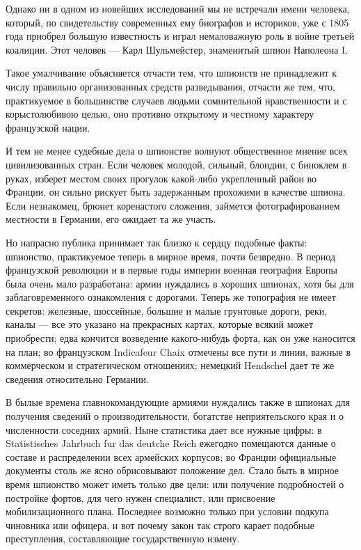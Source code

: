 \documentclass[
  oneside,
  12pt,
  titlepage]{book}
\begin{document}
Однако ни в одном из новейших исследований мы не встречали имени человека, который, по свидетельству современных ему биографов и историков, уже с 1805 года приобрел большую известность и играл немаловажную роль в войне третьей коалиции. Этот человек --- Карл Шульмейстер, знаменитый шпион Наполеона I.

Такое умалчивание объясняется отчасти тем, что шпионств не принадлежит к числу правильно организованных средств разведывания, отчасти же тем, что, практикуемое в большинстве случаев людьми сомнительной нравственности и с корыстолюбивою целью, оно противно открытому и честному характеру французской нации.

И тем не менее судебные дела о шпионстве волнуют общественное мнение всех цивилизованных стран. Если человек молодой, сильный, блондин, с биноклем в руках, изберет местом своих прогулок какой-либо укрепленный район во Франции, он сильно рискует быть задержанным прохожими в качестве шпиона. Если незнакомец, брюнет коренастого сложения, займется фотографированием местности в Германии, его ожидает та же участь.

Но напрасно публика принимает так близко к сердцу подобные факты: шпионство, практикуемое теперь в мирное время, почти безвредно. В период французской революции и в первые годы империи военная география Европы была очень мало разработана: армии нуждались в хороших шпионах, хотя бы для заблаговременного ознакомления с дорогами. Теперь же топография не имеет секретов: железные, шоссейные, большие и малые грунтовые дороги, реки, каналы --- все это указано на прекрасных картах, которые всякий может приобрести; едва кончится возведение какого-нибудь форта, как он уже наносится на план; во французском Indicafeur Chaix отмечены все пути и линии, важные в коммерческом и стратегическом отношениях; немецкий Hendschel дает те же сведения относительно Германии.

В былые времена главнокомандующие армиями нуждались также в шпионах для получения сведений о производительности, богатстве неприятельского края и о численности соседних армий. Ныне статистика дает все нужные цифры: в Statistisches Jahrbuch fur das deutche Reich ежегодно помещаются данные о составе и распределении всех армейских корпусов; во Франции официальные документы столь же ясно обрисовывают положение дел. Стало быть в мирное время шпионство может иметь только две цели: или получение подробностей о постройке фортов, для чего нужен специалист, или присвоение мобилизационного плана. Последнее возможно только при условии подкупа чиновника или офицера, и вот почему закон так строго карает подобные преступления, составляющие государственную измену.
\end{document}
